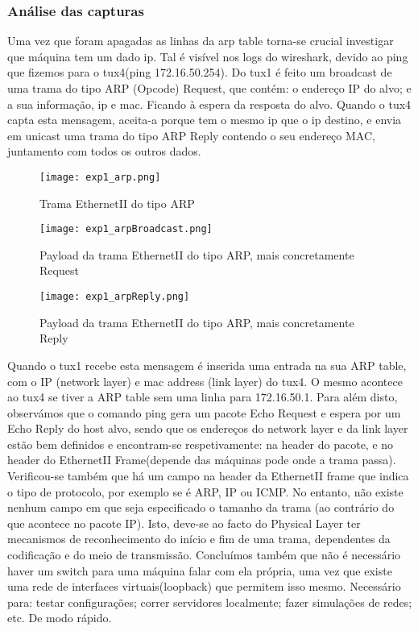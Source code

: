 \documentclass[a4paper]{article}
\begin{document}
\subsubsection{Análise das capturas}
Uma vez que foram apagadas as linhas da arp table torna-se crucial investigar
que máquina tem um dado ip. Tal é visível nos logs do wireshark, devido ao ping
que fizemos para o tux4(ping 172.16.50.254). Do tux1 é feito um broadcast de
uma trama do tipo ARP (Opcode) Request, que contém: o endereço IP do alvo; e a sua informação,
ip e mac. Ficando à espera da resposta do alvo. Quando o tux4 capta esta
mensagem, aceita-a porque tem o mesmo ip que o ip destino, e envia em unicast
uma trama do tipo ARP Reply contendo o seu endereço MAC, juntamento com todos os outros
dados.

\begin{figure}[h]
    \centering
    \texttt{[image: exp1\_arp.png]}
    \caption{Trama EthernetII do tipo ARP}
\end{figure}
\begin{figure}[h]
    \centering
    \texttt{[image: exp1\_arpBroadcast.png]}
    \caption{Payload da trama EthernetII do tipo ARP, mais concretamente Request}
\end{figure}
\begin{figure}[h]
    \centering
    \texttt{[image: exp1\_arpReply.png]}
    \caption{Payload da trama EthernetII do tipo ARP, mais concretamente Reply}
\end{figure}

Quando o tux1 recebe esta mensagem é inserida uma entrada na sua ARP table, com
o IP (network layer) e mac address (link layer) do tux4. O mesmo acontece ao
tux4 se tiver a ARP table sem uma linha para 172.16.50.1. Para além disto,
observámos que o comando ping gera um pacote Echo Request e espera por um Echo
Reply do host alvo, sendo que os endereços do network layer e da link layer
estão bem definidos e encontram-se respetivamente: na header do pacote, e no
header do EthernetII Frame(depende das máquinas pode onde a trama passa).
Verificou-se também que há um campo na header da EthernetII frame que indica o
tipo de protocolo, por exemplo se é ARP, IP ou ICMP. No entanto, não existe
nenhum campo em que seja especificado o tamanho da trama (ao contrário do que
acontece no pacote IP). Isto, deve-se ao facto do Physical Layer ter mecanismos
de reconhecimento do início e fim de uma trama, dependentes da codificação e do
meio de transmissão. Concluímos também que não é necessário haver um switch
para uma máquina falar com ela própria, uma vez que existe uma rede de
interfaces virtuais(loopback) que permitem isso mesmo. Necessário para: testar
configurações; correr servidores localmente; fazer simulações de redes; etc. De
modo rápido.
\end{document}
